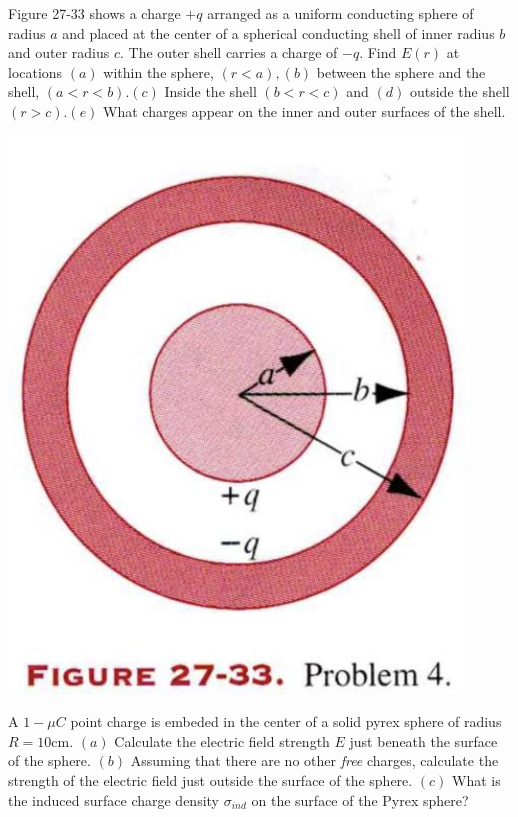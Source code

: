 \documentclass[11pt,letterpaper,boxed]{hmcpset}
\begin{document}
\begin{solution}
\vfill
\end{solution}
\newpage

\begin{problem}[HRK P27.4]
Figure 27-33 shows a charge $+q$ arranged as a uniform conducting sphere of radius $a$ and placed at the center of a spherical conducting shell of inner radius $b$ and outer radius $c$. The outer shell carries a charge of $-q$. Find $E(r)$ at locations $(a)$ within the sphere, $(r<a), (b)$ between the sphere and the shell, $(a<r<b). (c)$ Inside the shell $(b<r<c )$ and $(d)$ outside the shell $(r>c). (e)$ What charges appear on the inner and outer surfaces of the shell. 
\begin{center}
\includegraphics[scale=0.6]{27-33.png}
\end{center}
\end{problem}

\begin{solution}
\vfill
\end{solution}
\newpage

\begin{problem}[HRK E29.29]
A $1-\mu C$ point charge is embeded in the center of  a solid pyrex sphere of radius $R=10$cm. $(a)$ Calculate the electric field strength $E$ just beneath the surface of the sphere. $(b)$ Assuming that there are no other \textit{free} charges, calculate the strength of the electric field just outside the surface of the sphere. $(c)$ What is the induced surface charge density $\sigma_{ind}$ on the surface of the Pyrex sphere? 
\end{problem}

\begin{solution}
\vfill
\end{solution}
\end{document}
